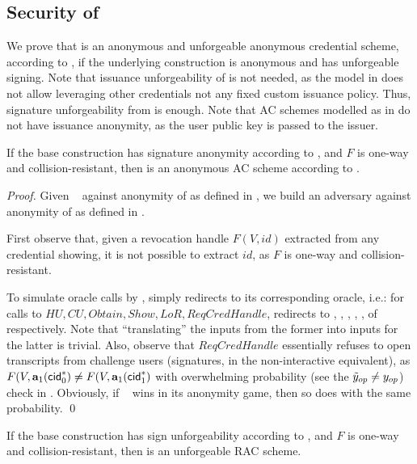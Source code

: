 \subsection{Security of \CUASRAC}

We prove that \CUASRAC is an anonymous and unforgeable anonymous credential
scheme, according to \cite{fhs19}, if the underlying \CUASGen construction
is anonymous and has unforgeable signing. Note that issuance unforgeability
of \CUASGen is not needed, as the model in \cite{fhs19} does not allow
leveraging other credentials not any fixed custom issuance policy. Thus,
signature unforgeability from \UAS is enough. Note that AC schemes modelled
as in \cite{fhs19} do not have issuance anonymity, as the user public key
is passed to the issuer.

\begin{theorem}
  \label{thm:anon-cuasac}
  If the base \CUASGen construction has signature anonymity according to
  , and $F$ is one-way and collision-resistant,
  then \CUASAC is an anonymous AC scheme according to \cite{fhs19}.
\end{theorem}

\begin{proof}
  Given \adv~ against anonymity of \CUASRAC as defined in
  , we build an adversary \advB against anonymity of
  \CUASGen as defined in .

  First observe that, given a revocation handle $F(V,id)$ extracted from any
  credential showing, it is not possible to extract $id$, as $F$ is one-way
  and collision-resistant.
  
  To simulate oracle calls by \adv, \advB simply redirects to its corresponding
  oracle, i.e.: for calls to $HU,CU,Obtain,Show,LoR,ReqCredHandle$, \advB
  redirects to \HUGEN, \CUGEN, \OBTAIN, \SIGN, \CHALb, of \OPEN respectively.
  Note that ``translating'' the inputs from the former into inputs for the
  latter is trivial. Also, observe that $ReqCredHandle$ essentially refuses to
  open transcripts from challenge users (signatures, in the non-interactive
  equivalent), as $F(V,\mathbf{a}_1(\mathsf{cid}^*_0) \neq F(V,\mathbf{a}_1(\mathsf{cid}^*_1)$ with
  overwhelming probability (see the $\tilde{y}_{op} \neq y_{op}$) check in
  . Obviously, if \adv~ wins in its anonymity game, then
  so does \advB with the same probability.
  \qed
\end{proof}

\begin{theorem}
  If the base \CUASGen construction has sign unforgeability according to
  , and $F$ is one-way and collision-resistant, then
  \CUASRAC is an unforgeable RAC scheme.
\end{theorem}

